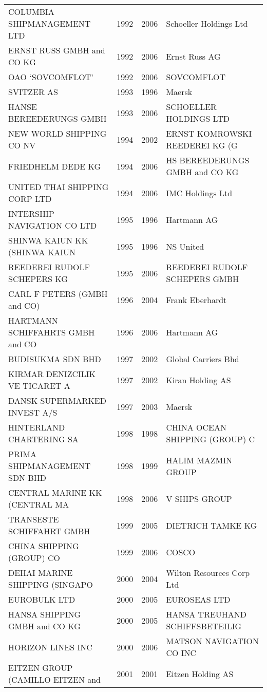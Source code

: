 \begin{tabular}[t]{lrrl}
COLUMBIA SHIPMANAGEMENT LTD & 1992 & 2006 & Schoeller Holdings Ltd\\
ERNST RUSS GMBH and CO KG & 1992 & 2006 & Ernst Russ AG\\
OAO ‘SOVCOMFLOT’ & 1992 & 2006 & SOVCOMFLOT\\
SVITZER AS & 1993 & 1996 & Maersk\\
HANSE BEREEDERUNGS GMBH & 1993 & 2006 & SCHOELLER HOLDINGS LTD\\
NEW WORLD SHIPPING CO NV & 1994 & 2002 & ERNST KOMROWSKI REEDEREI KG (G\\
FRIEDHELM DEDE KG & 1994 & 2006 & HS BEREEDERUNGS GMBH  and  CO KG\\
UNITED THAI SHIPPING CORP LTD & 1994 & 2006 & IMC Holdings Ltd\\
INTERSHIP NAVIGATION CO LTD & 1995 & 1996 & Hartmann AG\\
SHINWA KAIUN KK (SHINWA KAIUN & 1995 & 1996 & NS United\\
REEDEREI RUDOLF SCHEPERS KG & 1995 & 2006 & REEDEREI RUDOLF SCHEPERS GMBH\\
CARL F PETERS (GMBH and CO) & 1996 & 2004 & Frank Eberhardt\\
HARTMANN SCHIFFAHRTS GMBH and CO & 1996 & 2006 & Hartmann AG\\
BUDISUKMA SDN BHD & 1997 & 2002 & Global Carriers Bhd\\
KIRMAR DENIZCILIK VE TICARET A & 1997 & 2002 & Kiran Holding AS\\
DANSK SUPERMARKED INVEST A/S & 1997 & 2003 & Maersk\\
HINTERLAND CHARTERING SA & 1998 & 1998 & CHINA OCEAN SHIPPING (GROUP) C\\
PRIMA SHIPMANAGEMENT SDN BHD & 1998 & 1999 & HALIM MAZMIN GROUP\\
CENTRAL MARINE KK (CENTRAL MA & 1998 & 2006 & V SHIPS GROUP\\
TRANSESTE SCHIFFAHRT GMBH & 1999 & 2005 & DIETRICH TAMKE KG\\
CHINA SHIPPING (GROUP) CO & 1999 & 2006 & COSCO\\
DEHAI MARINE SHIPPING (SINGAPO & 2000 & 2004 & Wilton Resources Corp Ltd\\
EUROBULK LTD & 2000 & 2005 & EUROSEAS LTD\\
HANSA SHIPPING GMBH and CO KG & 2000 & 2005 & HANSA TREUHAND SCHIFFSBETEILIG\\
HORIZON LINES INC & 2000 & 2006 & MATSON NAVIGATION CO INC\\
EITZEN GROUP (CAMILLO EITZEN  and & 2001 & 2001 & Eitzen Holding AS\\

\end{tabular}
